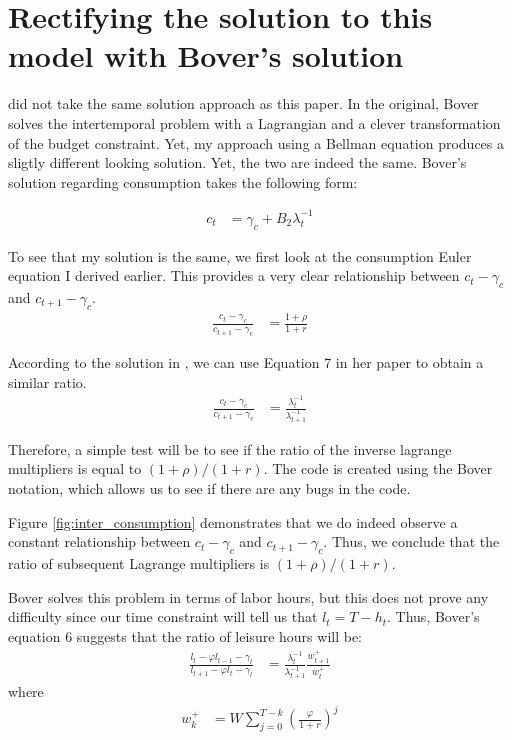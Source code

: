 \documentclass[\econtexRoot/ProjectMMD]{subfiles}
\begin{document}
\section{Rectifying the solution to this model with Bover's solution}

\cite{bover1991relaxing} did not take the same solution approach as this paper. In the original, Bover solves the intertemporal problem with a Lagrangian and a clever transformation of the budget constraint. Yet, my approach using a Bellman equation produces a sligtly different looking solution. Yet, the two are indeed the same. Bover's solution regarding consumption takes the following form:

\begin{align*}
  c_t &= \gamma_c + B_2 \lambda_t^{-1}
\end{align*}

To see that my solution is the same, we first look at the consumption Euler equation I derived earlier. This provides a very clear relationship between $c_t -\gamma_c$  and $c_{t+1} -\gamma_c$.
\begin{align*}
\frac{c_t - \gamma_c}{c_{t+1} - \gamma_c} &= \frac{1+\rho}{1+r}
\end{align*}

According to the solution in \cite{bover1991relaxing}, we can use Equation 7 in her paper to obtain a similar ratio.
\begin{align*}
  \frac{c_t - \gamma_c}{c_{t+1}-\gamma_c} &=  \frac{\lambda_t^{-1}}{\lambda_{t+1}^{-1}}
\end{align*}

Therefore, a simple test will be to see if the ratio of the inverse lagrange multipliers is equal to $(1+\rho) / (1+r)$. The code is created using the Bover notation, which allows us to see if there are any bugs in the code.



Figure \ref{fig:inter_consumption} demonstrates that we do indeed observe a constant relationship between $c_t -\gamma_c$ and $c_{t+1} - \gamma_c$. Thus, we conclude that the ratio of subsequent Lagrange multipliers is $(1+\rho)/(1+r)$.


Bover solves this problem in terms of labor hours, but this does not prove any difficulty since our time constraint will tell us that $l_t = T-h_t$. Thus, Bover's equation 6 suggests that the ratio of leisure hours will be:
\begin{align}
  \frac{ l_t - \varphi l_{t-1} - \gamma_l}{l_{t+1} - \varphi l_t - \gamma_l} &= \frac{\lambda_t^{-1}}{\lambda_{t+1}^{-1}} \frac{w_{t+1}^{+}}{w_t^{+}} \label{eq:bover_focl}
\end{align}
where
\begin{align*}
  w_k^{+} &=W \sum_{j=0}^{T-k}\left( \frac{\varphi}{1+r}\right) ^j
\end{align*}
\end{document}
